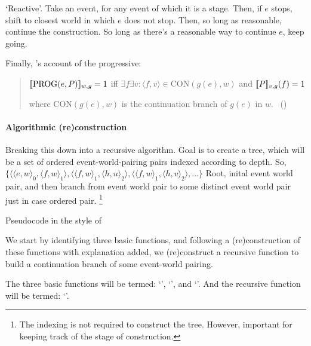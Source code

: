 \begin{note}
  `Reactive'.
  Take an event, for any event of which it is a stage.
  Then, if \(e\) stops, shift to closest world in which \(e\) does not stop.
  Then, so long as reasonable, continue the construction.
  So long as there's a reasonable way to continue \(e\), keep going.
\end{note}

\begin{note}
  Finally, \citeauthor{Landman:1992wh}'s account of the progressive:
  \begin{quote}
    \(\sem{\text{PROG}(e, P)}_{w,g} = 1\) iff \(\exists f \exists v\colon \langle f,v \rangle \in \text{CON}(g(e), w)\)\newline
    \phantom{an} and \(\sem{P}_{v,g}(f) = 1\)\par

    where \(\text{CON}(g(e), w)\) is the continuation branch of \(g(e)\) in \(w\).\newline
        \mbox{ }\hfill\mbox{(\citeyear[27]{Landman:1992wh})}
  \end{quote}
\end{note}

\paragraph{Algorithmic (re)construction}

\begin{note}
  Breaking this down into a recursive algorithm.
  Goal is to create a tree, which will be a set of ordered event-world-pairing pairs indexed according to depth.
  So, \(\{\langle \langle e,w \rangle_{0}, \langle f,w \rangle_{1} \rangle, \langle \langle f,w \rangle_{1}, \langle h,u \rangle_{2} \rangle, \langle \langle f,w \rangle_{1}, \langle h,v \rangle_{2} \rangle, \dots \}\)
  Root, inital event world pair, and then branch from event world pair to some distinct event world pair just in case ordered pair.
  \footnote{
    The indexing is not required to construct the tree.
    However, important for keeping track of the stage of construction.
  }

  Pseudocode in the style of ~\textcite{Cormen:2009uw}

  We start by identifying three basic functions, and following a (re)construction of these functions with explanation added, we (re)construct a recursive function to build a continuation branch of some event-world pairing.

  The three basic functions will be termed:
  `\AlgAC{}', `\AlgGetStops{}', and `\AlgFindBranches{}'.
  And the recursive function will be termed:
  `\AlgDevelopTree{}'.
\end{note}

